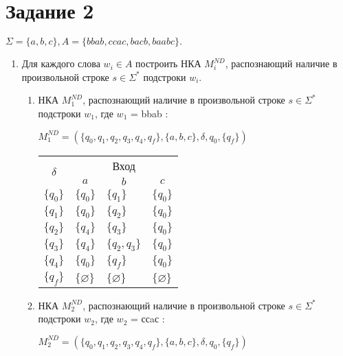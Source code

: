 \section*{Задание 2}
$\Sigma = \{a, b, c\}, A = \{bbab, ccac, bacb, baabc\}.$
\begin{enumerate}[label=(\roman{*})]
	\item Для каждого слова $w_i \in A$ построить НКА $M^{ND}_i$, распознающий наличие в произвольной строке $s \in \Sigma^*$ подстроки $w_i$.
	
	
	\begin{enumerate}
		\item НКА $M^{ND}_1$, распознающий наличие в произвольной строке $s \in \Sigma^*$ подстроки $w_1$, где $w_1$ = bbab :
		
		$M^{ND}_1 = (\{q_0, q_1, q_2, q_3, q_4, q_f\}, \{a, b, c\}, \delta, q_0, \{q_f\})$  
		
		
			\begin{center}
			\begin{tabular}{llll}
				\toprule
				\multicolumn{1}{c}{\multirow{2}{*}{\Large $\delta$}}
				& \multicolumn{3}{c}{Вход} \\
				\cmidrule(rl){2-4}
				& \multicolumn{1}{c}{$a$}
				& \multicolumn{1}{c}{$b$} 
				& \multicolumn{1}{c}{$c$} \\
				\midrule
				$\{q_0\}$       & $\{q_0\}$      		 & $\{q_1\}$     &$\{q_0\}$  \\
				$\{q_1\}$       & $\{q_0\}$    			 & $\{q_2\}$     &$\{q_0\}$ \\
				$\{q_2\}$       & $\{q_4\}$    			 & $\{q_3\}$     &$\{q_0\}$  \\
				$\{q_3\}$       & $\{q_4\}$    			 & $\{q_2, q_3\}$     &$\{q_0\}$  \\
				$\{q_4\}$       & $\{q_0\}$    			 & $\{q_f\}$     &$\{q_0\}$  \\
				$\{q_f\}$       & $\{\varnothing\}$    	 & $\{\varnothing\}$     &$\{\varnothing\}$  \\
				\bottomrule
			\end{tabular}
		\end{center}
		
		
		\item НКА $M^{ND}_2$, распознающий наличие в произвольной строке $s \in \Sigma^*$ подстроки $w_2$, где $w_2$ = ссaс :
		
		$M^{ND}_2 = (\{q_0, q_1, q_2, q_3, q_4, q_f\}, \{a, b, c\}, \delta, q_0, \{q_f\})$
		

\end{enumerate}
\end{enumerate}
